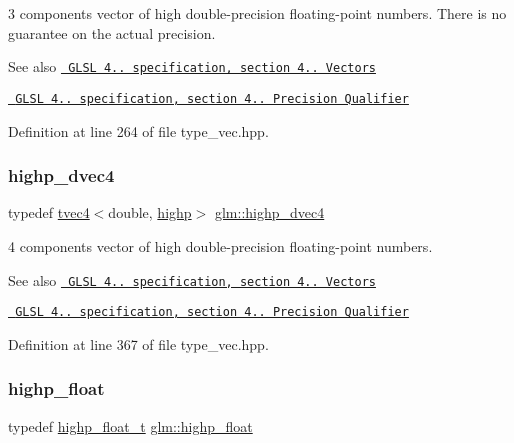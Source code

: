 3 components vector of high double-\/precision floating-\/point numbers. There is no guarantee on the actual precision.

\begin{DoxySeeAlso}{See also}
\href{http://www.opengl.org/registry/doc/GLSLangSpec.4.20.8.pdf}{\texttt{ G\+L\+SL 4.. specification, section 4.. Vectors}} 

\href{http://www.opengl.org/registry/doc/GLSLangSpec.4.20.8.pdf}{\texttt{ G\+L\+SL 4.. specification, section 4.. Precision Qualifier}} 
\end{DoxySeeAlso}


Definition at line 264 of file type\+\_\+vec.\+hpp.

\mbox{\label{group__core__precision_ga2bb20b4bd180746b93577bc57f4b2b9d}} 
\subsubsection{\texorpdfstring{highp\_dvec4}{highp\_dvec4}}
{\footnotesize\ttfamily typedef \mbox{\hyperlink{structglm_1_1tvec4}{tvec4}}$<$double, \mbox{\hyperlink{namespaceglm_a0f04f086094c747d227af4425893f545ac6f7eab42eacbb10d59a58e95e362074}{highp}}$>$ \mbox{\hyperlink{group__core__precision_ga2bb20b4bd180746b93577bc57f4b2b9d}{glm\+::highp\+\_\+dvec4}}}

4 components vector of high double-\/precision floating-\/point numbers.

\begin{DoxySeeAlso}{See also}
\href{http://www.opengl.org/registry/doc/GLSLangSpec.4.20.8.pdf}{\texttt{ G\+L\+SL 4.. specification, section 4.. Vectors}} 

\href{http://www.opengl.org/registry/doc/GLSLangSpec.4.20.8.pdf}{\texttt{ G\+L\+SL 4.. specification, section 4.. Precision Qualifier}} 
\end{DoxySeeAlso}


Definition at line 367 of file type\+\_\+vec.\+hpp.

\mbox{\label{group__core__precision_ga3d443a093adc053638ed7f81c5bfe300}} 
\subsubsection{\texorpdfstring{highp\_float}{highp\_float}}
{\footnotesize\ttfamily typedef \mbox{\hyperlink{namespaceglm_af6f4e45ae06ae3f979dd30cafe7d07c6}{highp\+\_\+float\+\_\+t}} \mbox{\hyperlink{group__core__precision_ga3d443a093adc053638ed7f81c5bfe300}{glm\+::highp\+\_\+float}}}

